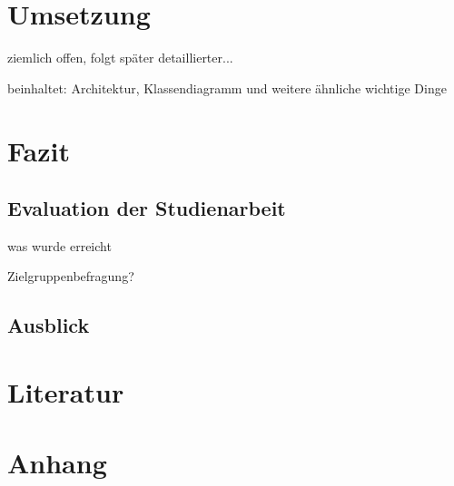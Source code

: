 \documentclass[a4paper]{article}
\begin{document}
\section{Umsetzung}

ziemlich offen, folgt später detaillierter...

beinhaltet: Architektur, Klassendiagramm und weitere ähnliche wichtige Dinge

\section{Fazit}

\subsection{Evaluation der Studienarbeit}

was wurde erreicht

Zielgruppenbefragung?

\subsection{Ausblick}

\section{Literatur}

\section{Anhang}



\end{document}
